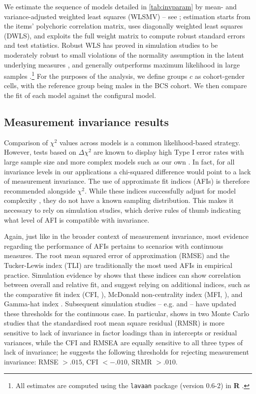 We estimate the sequence of models detailed in \autoref{tab:invparam} by mean- and variance-adjusted weighted least squares (WLSMV) -- see \citet{Muthen1997}; estimation starts from the items' polychoric correlation matrix, uses diagonally weighted least squares (DWLS), and exploits the full weight matrix to compute robust standard errors and test statistics. Robust WLS has proved in simulation studies to be moderately robust to small violations of the normality assumption in the latent underlying measures \citep{Flora2004}, and generally outperforms maximum likelihood in large samples \citep{Beauducel2006,Li2016}.\footnote{All estimates are computed using the \texttt{lavaan} package (version 0.6-2) in \textbf{\textsf{R}} \citep{Rosseel2012}.}
For the purposes of the analysis, we define groups $c$ as cohort-gender cells, with the reference group being males in the BCS cohort. We then compare the fit of each model against the configural model.

\subsection{Measurement invariance results \label{sec:mires}}

Comparison of $\chi^2$ values across models is a common likelihood-based strategy. However, tests based on $\Delta \chi^2$ are known to display high Type I error rates with large sample size and more complex models such as our own \citep{Sass2014}. In fact, for all invariance levels in our applications a chi-squared difference would point to a lack of measurement invariance. The use of approximate fit indices (AFIs) is therefore recommended alongside $\chi^2$. While these indices successfully adjust for model complexity \citep{Cheung2002}, they do not have a known sampling distribution. This makes it necessary to rely on simulation studies, which derive rules of thumb indicating what level of \textDelta AFI is compatible with invariance.

Again, just like in the broader context of measurement invariance, most evidence regarding the performance of AFIs pertains to scenarios with continuous measures. The root mean squared error of approximation (RMSE) and the Tucker-Lewis index (TLI) are traditionally the most used AFIs in empirical practice. Simulation evidence by \citet{Cheung2002} shows that these indices can show correlation between overall and relative fit, and suggest relying on additional indices, such as the comparative fit index (CFI, \citealp{Bentler1990}), McDonald non-centrality index (MFI, \citealp{McDonald1989}), and Gamma-hat index \citep{Steiger1989}. Subsequent simulation studies -- e.g. \citet{Chen2007} and \citet{Meade2008} -- have updated these thresholds for the continuous case. In particular, \citet{Chen2007} shows in two Monte Carlo studies that the standardised root mean square residual (RMSR) is more sensitive to lack of invariance in factor loadings than in intercepts or residual variances, while the CFI and RMSEA are equally sensitive to all three types of lack of invariance; he suggests the following thresholds for rejecting measurement invariance: \textDelta RMSE $> .015$, \textDelta CFI $< - .010$, \textDelta SRMR $> .010$. 

